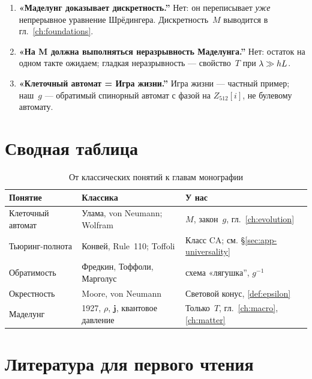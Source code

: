 \begin{remark}
\begin{enumerate}
\item \textbf{«Маделунг доказывает дискретность.''} Нет: он переписывает \emph{уже} непрерывное уравнение Шрёдингера.
  Дискретность~$M$ выводится в гл.~\ref{ch:foundations}.
\item \textbf{«На M должна выполняться неразрывность Маделунга.''} Нет: остаток на одном такте
  ожидаем; гладкая неразрывность --- свойство~$T$ при $\lambda\gg hL$.
\item \textbf{«Клеточный автомат = Игра жизни.''} Игра жизни --- частный пример;
  наш~$g$ --- обратимый спинорный автомат с фазой на $Z_{512}[i]$, не булевому автомату.
\end{enumerate}
\end{remark}

\section{Сводная таблица}

\begin{table}[ht]
\centering
\caption{От классических понятий к главам монографии}
\label{tab:app-map}
\small
\begin{tabular}{@{}p{3.2cm}p{4.2cm}p{5.8cm}@{}}
\toprule
Понятие & Классика & У нас \\
\midrule
Клеточный автомат & Улама, von Neumann; Wolfram & $M$, закон~$g$, гл.~\ref{ch:evolution} \\
Тьюринг-полнота & Конвей, Rule~110; Toffoli & Класс CA; см. \S\ref{sec:app-universality} \\
Обратимость & Фредкин, Тоффоли, Марголус & схема «лягушка'', $g^{-1}$ \\
Окрестность & Moore, von Neumann & Световой конус, \cref{def:epsilon} \\
Маделунг & 1927, $\rho$, $\mathbf{j}$, квантовое давление & Только~$T$, гл.~\ref{ch:macro}, \ref{ch:matter} \\
\bottomrule
\end{tabular}
\end{table}

\section{Литература для первого чтения}

